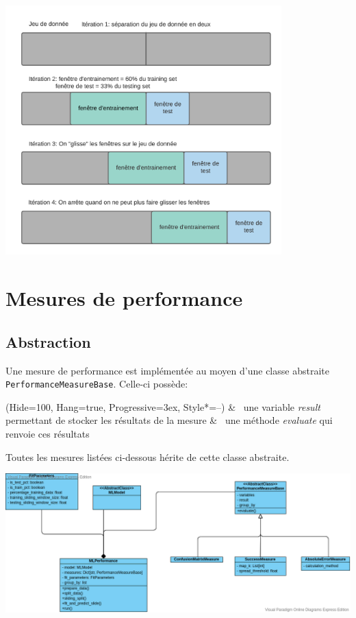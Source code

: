 \begin{center}
\includegraphics[width=0.8\textwidth]{figures/Sliding_split.png}
\label{fig9}
\end{center}

\section{Mesures de performance}


\subsection{Abstraction}

Une mesure de performance est implémentée au moyen d’une classe abstraite \texttt{PerformanceMeasureBase}. Celle-ci possède:
\begin{easylist}
\ListProperties(Hide=100, Hang=true, Progressive=3ex, Style*=--)
& ~une variable \textit{result} permettant de stocker les résultats de la mesure
& ~une méthode \textit{evaluate} qui renvoie ces résultats
\end{easylist}

Toutes les mesures listées ci-dessous hérite de cette classe abstraite.  

\begin{center}
\includegraphics[width=1.1\textwidth]{figures/diagramme_classe_perf.png}
\label{fig5}
\end{center}

